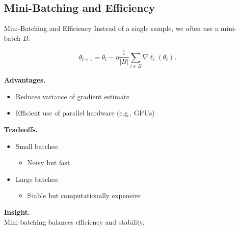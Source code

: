 \documentclass[aspectratio=169,11pt]{beamer}
\begin{document}
\subsection{Mini-Batching and Efficiency}
\begin{frame}[t,allowframebreaks]{Mini-Batching and Efficiency}
\small
Instead of a single sample, we often use a mini-batch $B$:

\[
\theta_{t+1} = \theta_t - \eta \frac{1}{|B|} \sum_{i \in B} \nabla \ell_i(\theta_t).
\]

\textbf{Advantages.}\\ \begin{itemize}
    \item Reduces variance of gradient estimate
    \item Efficient use of parallel hardware (e.g., GPUs)
\end{itemize}

\textbf{Tradeoffs.}\\ \begin{itemize}
    \item Small batches:
    \begin{itemize}
        \item Noisy but fast
    \end{itemize}
    \item Large batches:
    \begin{itemize}
        \item Stable but computationally expensive
    \end{itemize}
\end{itemize}

\textbf{Insight.}\\ Mini-batching balances efficiency and stability.
\end{frame}
\end{document}
